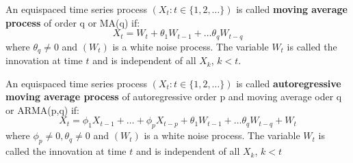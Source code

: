 \begin{example}
    An equispaced time series process $(X_t: t \in \{1,2, \dots\})$ is called \textbf{moving average process}
    of order q or MA(q) if:
    \[
        X_t = W_t + \theta_1 W_{t-1} + \dots \theta_q W_{t-q}
    \]
    where $\theta_q \neq 0$ and $(W_t)$ is a white noise process.
    The variable $W_t$ is called the innovation at time $t$ and is independent of all $X_k$, $k < t$.
\end{example}


\begin{example}
    An equispaced time series process $(X_t: t \in \{1,2, \dots\})$ is called \textbf{autoregressive moving average process}
    of autoregressive order p and moving average oder q or ARMA(p,q) if:
    \[
        X_t =  \phi_1 X_{t-1} + \dots + \phi_p X_{t-p} + \theta_1 W_{t-1} + \dots \theta_q W_{t-q} + W_t
    \]
    where $\phi_p \neq 0, \theta_q \neq 0$ and $(W_t)$ is a white noise process.
    The variable $W_t$ is called the innovation at time $t$ and is independent of all $X_k$, $k < t$

\end{example}





